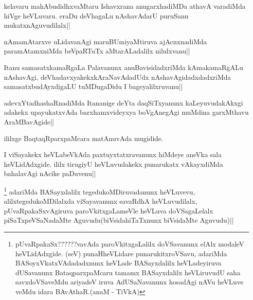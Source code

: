 
\begin{artha}
kelavaru mahAbudidhxvaMtaru Ishavxrana anugarxhadiMDa athavA varadiMda hiVge heVLuvaru. eraDu deVhagaLu nAshavAdarU puruSanu mukatxnAguvudilalx||
\end{artha}


\begin{artha}
nAmamAtarxve uLidavanAgi maruBUmiyaMtiruva ajAcnxnadiMda paramAtamxniMda beVpaRTuTx 
aMtarALadalilx nilulxvanu||
\end{artha}

\begin{artha}
Itanu samasatxkamaRgaLa Palavanunx anuBavisidadxriMda kAmakamaRgALu nAshavAgi, deVhadavxyakekxkAraNavAdadUdx nAshavAgidadxdadxriMda samasatxbudAyxdigaLU tuMDugaDidu  I bageyalilxruvanu||
\end{artha}

\begin{artha}
adevxYtadhashaRnadiMda Itananige deYta daqSiTxyanunx kaLeyuvudakAkxgi adakekx upayukatxvAda barxhamxvideyxya boVgAnegAgi muMdina garxMthavu AraMBavAgide||
\end{artha}

\begin{center}
ililxge BaqtaqRparxpaMcara matAnuvAda mugidide.
\end{center}


\begin{artha}
I viSayakekx heVLabeVkAda paxtuyxtatxravanunx hiMdeye aneVka sala heVLidAdxgide. ililx 
tirugiyU heVLuvudakekx punarukatx vAkayxdiMda bahalavAgi nAcike paDuvenu||
\end{artha}

\begin{artha}
\footnote[1]{pUvaRpakaSx??????vavAda paroVkitxgaLalilx doVSavanunx elAlx modaleV heVLidAdxgide. (seV) punaHheVLidare punarukitxroVSavu, adariMda BASoyxVkatxVAdadadxnunx heVLade BASayxdalilx heVLadeyiruva dUSavanunx BataqparxpaMcaru tamamx BASayxdalilx heVLiruvudU saha savxdoVSaveMdu ariyadeV iruva AdUSaNavanunx hosadAgi nAVu heVLuve veMdu idara BAvAthaR.(anaM - TiVkA)} adariMda BASayxdalilx tegedukoMDiruvadanunx heVLuvevu, alilxtegedukoMDilalxda viSayavanunx savaRdhA heVLuvudilalx, pUvaRpakaSxvAgiruva paroVkitxgaLameVle heVLuva doVSagaLelalx piSaTxpeVSaNadaMte Aguvudu(biVsidahiTaTxnunx biVsidaMte Aguvudu)||
\end{artha}

